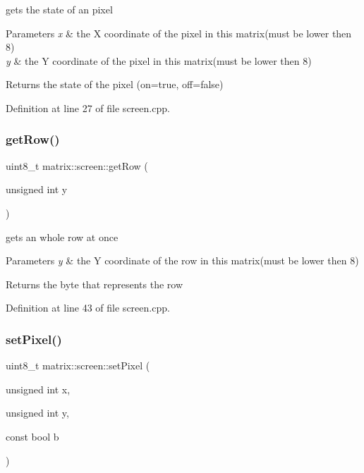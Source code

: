 gets the state of an pixel 


\begin{DoxyParams}{Parameters}
{\em x} & the X coordinate of the pixel in this matrix(must be lower then 8) \\
\hline
{\em y} & the Y coordinate of the pixel in this matrix(must be lower then 8) \\
\hline
\end{DoxyParams}
\begin{DoxyReturn}{Returns}
the state of the pixel (on=true, off=false) 
\end{DoxyReturn}


Definition at line 27 of file screen.\+cpp.

\mbox{\label{classmatrix_1_1screen_afead7e5faa463cbcef0b9fb0917be60c}} 
\subsubsection{\texorpdfstring{get\+Row()}{getRow()}}
{\footnotesize\ttfamily uint8\+\_\+t matrix\+::screen\+::get\+Row (\begin{DoxyParamCaption}\item[{unsigned int}]{y }\end{DoxyParamCaption})}



gets an whole row at once 


\begin{DoxyParams}{Parameters}
{\em y} & the Y coordinate of the row in this matrix(must be lower then 8) \\
\hline
\end{DoxyParams}
\begin{DoxyReturn}{Returns}
the byte that represents the row 
\end{DoxyReturn}


Definition at line 43 of file screen.\+cpp.

\mbox{\label{classmatrix_1_1screen_a5559c58b3ed547d37130db5de06fd4fe}} 
\subsubsection{\texorpdfstring{set\+Pixel()}{setPixel()}}
{\footnotesize\ttfamily uint8\+\_\+t matrix\+::screen\+::set\+Pixel (\begin{DoxyParamCaption}\item[{unsigned int}]{x,  }\item[{unsigned int}]{y,  }\item[{const bool}]{b }\end{DoxyParamCaption})}



